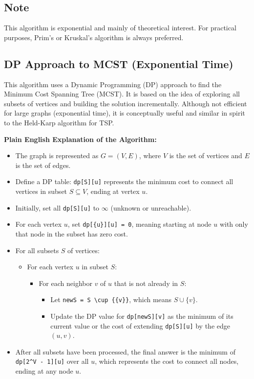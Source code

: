 \documentclass[14pt,a4paper]{extarticle}
\begin{document}
\subsection*{Note}
This algorithm is exponential and mainly of theoretical interest.
For practical purposes, Prim’s or Kruskal’s algorithm is always preferred.

\newpage
\subsection*{DP Approach to MCST (Exponential Time)}

This algorithm uses a Dynamic Programming (DP) approach to find the Minimum Cost Spanning Tree (MCST). It is based on the idea of exploring all subsets of vertices and building the solution incrementally. Although not efficient for large graphs (exponential time), it is conceptually useful and similar in spirit to the Held-Karp algorithm for TSP.

\vspace{1em}
\textbf{Plain English Explanation of the Algorithm:}
\begin{itemize}
    \item The graph is represented as \(G = (V, E)\), where \(V\) is the set of vertices and \(E\) is the set of edges.
    \item Define a DP table: \texttt{dp[S][u]} represents the minimum cost to connect all vertices in subset \(S \subseteq V\), ending at vertex \(u\).
    \item Initially, set all \texttt{dp[S][u]} to \(\infty\) (unknown or unreachable).
    \item For each vertex \(u\), set \texttt{dp[\{u\}][u] = 0}, meaning starting at node \(u\) with only that node in the subset has zero cost.
    \item For all subsets \(S\) of vertices:
    \begin{itemize}
        \item For each vertex \(u\) in subset \(S\):
        \begin{itemize}
            \item For each neighbor \(v\) of \(u\) that is not already in \(S\):
            \begin{itemize}
                \item Let \texttt{newS = S \textbackslash{}cup \{\{v\}\}}, which means \(S \cup \{v\}\).
                \item Update the DP value for \texttt{dp[newS][v]} as the minimum of its current value or the cost of extending \texttt{dp[S][u]} by the edge \((u,v)\).
            \end{itemize}
        \end{itemize}
    \end{itemize}
    \item After all subsets have been processed, the final answer is the minimum of \texttt{dp[2\^{}V - 1][u]} over all \(u\), which represents the cost to connect all nodes, ending at any node \(u\).
\end{itemize}
\end{document}
